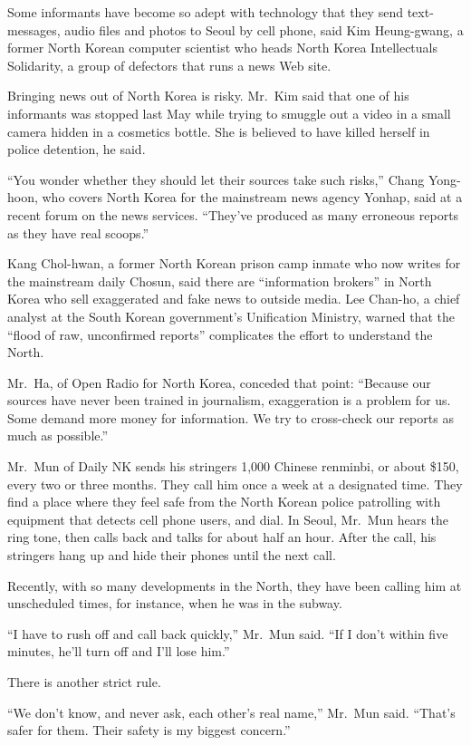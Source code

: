 ﻿\documentclass[12pt]{article}
\begin{document}
Some informants have become so adept with technology that they send text-messages, audio files and
photos to Seoul by cell phone, said Kim Heung-gwang, a former North Korean computer scientist who
heads North Korea Intellectuals Solidarity, a group of defectors that runs a news Web site.

Bringing news out of North Korea is risky. Mr.~Kim said that one of his informants was stopped last
May while trying to smuggle out a video in a small camera hidden in a cosmetics bottle. She is
believed to have killed herself in police detention, he said.

``You wonder whether they should let their sources take such risks,'' Chang Yong-hoon, who covers
North Korea for the mainstream news agency Yonhap, said at a recent forum on the news services.
``They've produced as many erroneous reports as they have real scoops.''

Kang Chol-hwan, a former North Korean prison camp inmate who now writes for the mainstream daily
Chosun, said there are ``information brokers'' in North Korea who sell exaggerated and fake news to
outside media. Lee Chan-ho, a chief analyst at the South Korean government's Unification Ministry,
warned that the ``flood of raw, unconfirmed reports'' complicates the effort to understand the
North.

Mr.~Ha, of Open Radio for North Korea, conceded that point: ``Because our sources have never been
trained in journalism, exaggeration is a problem for us. Some demand more money for information. We
try to cross-check our reports as much as possible.''

Mr.~Mun of Daily NK sends his stringers 1,000 Chinese renminbi, or about \$150, every two or three
months. They call him once a week at a designated time. They find a place where they feel safe from
the North Korean police patrolling with equipment that detects cell phone users, and dial. In Seoul,
Mr.~Mun hears the ring tone, then calls back and talks for about half an hour. After the call, his
stringers hang up and hide their phones until the next call.

Recently, with so many developments in the North, they have been calling him at unscheduled times,
for instance, when he was in the subway.

``I have to rush off and call back quickly,'' Mr.~Mun said. ``If I don't within five minutes, he'll
turn off and I'll lose him.''

There is another strict rule.

``We don't know, and never ask, each other's real name,'' Mr.~Mun said. ``That's safer for them.
Their safety is my biggest concern.''

\vocabulary
\end{document}
